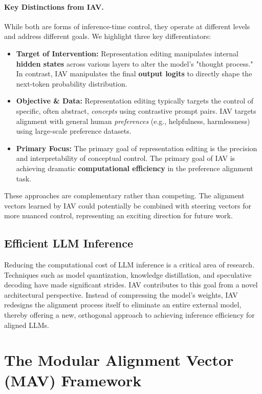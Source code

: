 \documentclass{article} %
\begin{document}
\paragraph{Key Distinctions from IAV.} While both are forms of inference-time control, they operate at different levels and address different goals. We highlight three key differentiators:
\begin{itemize}
\item \textbf{Target of Intervention:} Representation editing manipulates internal \textbf{hidden states} across various layers to alter the model's "thought process." In contrast, IAV manipulates the final \textbf{output logits} to directly shape the next-token probability distribution.
\item \textbf{Objective \& Data:} Representation editing typically targets the control of specific, often abstract, \textit{concepts} using contrastive prompt pairs. IAV targets alignment with general human \textit{preferences} (e.g., helpfulness, harmlessness) using large-scale preference datasets.
\item \textbf{Primary Focus:} The primary goal of representation editing is the precision and interpretability of conceptual control. The primary goal of IAV is achieving dramatic \textbf{computational efficiency} in the preference alignment task.
\end{itemize}
These approaches are complementary rather than competing. The alignment vectors learned by IAV could potentially be combined with steering vectors for more nuanced control, representing an exciting direction for future work.

\subsection{Efficient LLM Inference}
Reducing the computational cost of LLM inference is a critical area of research. Techniques such as model quantization, knowledge distillation, and speculative decoding \citep{leviathan2023fast} have made significant strides. IAV contributes to this goal from a novel architectural perspective. Instead of compressing the model's weights, IAV redesigns the alignment process itself to eliminate an entire external model, thereby offering a new, orthogonal approach to achieving inference efficiency for aligned LLMs.
\section{The Modular Alignment Vector (MAV) Framework}
\end{document}
